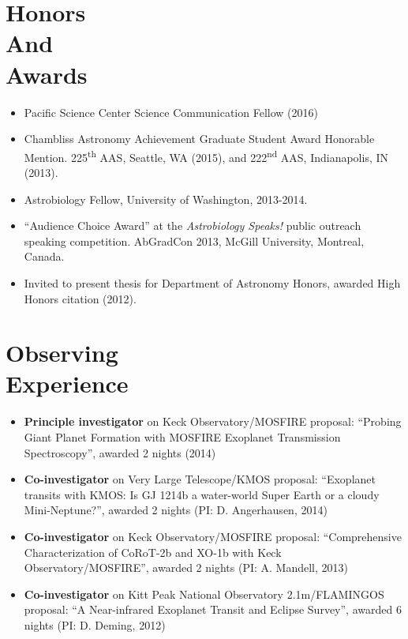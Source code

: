 \documentclass[margin]{res}
\begin{document}
\begin{resume}
\section{Honors\\And\\Awards} 
\begin{itemize}  
\item Pacific Science Center Science Communication Fellow (2016)

\item Chambliss Astronomy Achievement Graduate Student Award Honorable Mention. 225\textsuperscript{th} AAS, Seattle, WA (2015), and 222\textsuperscript{nd} AAS, Indianapolis, IN (2013).
 
\item Astrobiology Fellow, University of Washington, 2013-2014.

\item ``Audience Choice Award'' at the \textit{Astrobiology Speaks!} public outreach speaking competition. AbGradCon 2013, McGill University, Montreal, Canada. 

\item Invited to present thesis for Department of Astronomy Honors, awarded High Honors citation (2012).\\
\end{itemize}
                 
\section{Observing\\Experience}
\begin{itemize}   
\item {\bf Principle investigator} on Keck Observatory/MOSFIRE proposal: ``Probing Giant Planet Formation with MOSFIRE Exoplanet Transmission Spectroscopy'', awarded 2 nights (2014)

\item {\bf Co-investigator} on Very Large Telescope/KMOS proposal: ``Exoplanet transits with KMOS: Is GJ 1214b a water-world Super Earth or a cloudy Mini-Neptune?'', awarded 2 nights (PI: D. Angerhausen, 2014)

\item {\bf Co-investigator} on Keck Observatory/MOSFIRE proposal: ``Comprehensive Characterization of CoRoT-2b and XO-1b with Keck Observatory/MOSFIRE'', awarded 2 nights (PI: A. Mandell, 2013)

\item {\bf Co-investigator} on Kitt Peak National Observatory 2.1m/FLAMINGOS proposal: ``A Near-infrared Exoplanet Transit and Eclipse Survey'', awarded 6 nights (PI: D. Deming, 2012)


\end{itemize}
\end{resume}
\end{document}
